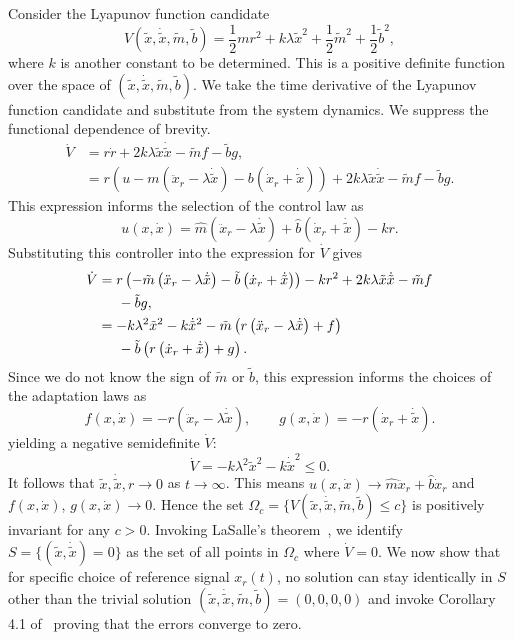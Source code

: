 Consider the Lyapunov function candidate
%
\begin{equation}
    V(\tilde{x}, \dot{\tilde{x}}, \tilde{m}, \tilde{b}) = \frac{1}{2}mr^2 + 
    k\lambda\tilde{x}^2 + \frac{1}{2}\tilde{m}^2 + \frac{1}{2}\tilde{b}^2,
    \label{eq:lyap_cand}
\end{equation}
%
where $k$ is another constant to be determined. This is a positive definite
function over the space of $(\tilde{x}, \dot{\tilde{x}}, \tilde{m}, \tilde{b})$.
We take the time derivative of the Lyapunov function candidate and substitute
from the system dynamics. We suppress the functional dependence of brevity.
%
\begin{align*}
    \dot{V} &= r\dot{r} + 2k\lambda\tilde{x}\dot{\tilde{x}} - \tilde{m}f -
    \tilde{b}g, \\
    &= r\left(u - m\left(\ddot{x}_r - \lambda\dot{\tilde{x}}\right)
    -b\left(\dot{x}_r + \dot{\tilde{x}} \right)\right) +
    2k\lambda\tilde{x}\dot{\tilde{x}} - \tilde{m}f - \tilde{b}g.
\end{align*}
%
This expression informs the selection of the control law as \[ \boxed{u(x, 
\dot{x}) = \hat{m}\left(\ddot{x}_r - \lambda\dot{\tilde{x}}\right) +
\hat{b}\left(\dot{x}_r + \dot{\tilde{x}}\right) - kr}. \] Substituting this
controller into the expression for $\dot{V}$ gives
%
\begin{align*}
    \dot{V} &= r\left(-\tilde{m}\left(\ddot{x}_r - \lambda\dot{\tilde{x}}\right) 
    - \tilde{b}\left(\dot{x}_r+\dot{\tilde{x}}\right)\right) - kr^2 + 
    2k\lambda\tilde{x}\dot{\tilde{x}} -\tilde{m}f\\ 
    &{\hspace{5mm}} - \tilde{b}g, \\
    &= -k\lambda^2\tilde{x}^2 - k\dot{\tilde{x}}^2 -
    \tilde{m}\left(r\left(\ddot{x}_r - \lambda\dot{\tilde{x}}\right) + f\right)
    \\
    &{\hspace{5mm}}-\tilde{b}\left(r\left(\dot{x}_r +
    \dot{\tilde{x}}\right)+g\right).
\end{align*}
%
Since we do not know the sign of $\tilde{m}$ or $\tilde{b}$, this expression
informs the choices of the adaptation laws as
\[\boxed{f(x, \dot{x}) = -r\left(\ddot{x}_r - \lambda \dot{\tilde{x}}\right)}, \qquad 
\boxed{g(x, \dot{x}) = -r\left( \dot{x}_r + \dot{\tilde{x}} \right)}. \] yielding a
negative semidefinite $\dot{V}$:
\[\dot{V} = -k\lambda^2\tilde{x}^2 - k\dot{\tilde{x}}^2 \leq 0. \]
%
It follows that $\tilde{x}, \dot{\tilde{x}}, r \rightarrow 0$ as $t \rightarrow
\infty$. This means $u(x, \dot{x}) \rightarrow \hat{m}\ddot{x}_r +
\hat{b}\dot{x}_r$ and $f(x, \dot{x})$, $g(x, \dot{x}) \rightarrow 0$. Hence the
set $\Omega_c = \{V(\tilde{x}, \dot{\tilde{x}}, \tilde{m}, \tilde{b}) \leq c \}$
is positively invariant for any $c > 0$. Invoking LaSalle's
theorem~\cite{khalil2015nonlinear}, we identify $S = \{(\tilde{x},
\dot{\tilde{x}}) = 0\}$ as the set of all points in $\Omega_c$ where $\dot{V} =
0$. We now show that for specific choice of reference signal $x_r(t)$, no
solution can stay identically in $S$ other than the trivial solution
$(\tilde{x}, \dot{\tilde{x}}, \tilde{m}, \tilde{b}) = (0,0,0,0)$ and invoke
Corollary 4.1 of~\cite{khalil2015nonlinear} proving that the errors converge to
zero.

